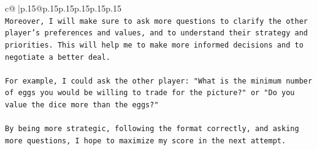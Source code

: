 \documentclass{article}
\begin{document}
{\begin{supertabular}{c@{$\;$}|p{.15\linewidth}@{}p{.15\linewidth}p{.15\linewidth}p{.15\linewidth}p{.15\linewidth}p{.15\linewidth}}
{{{\\ 
\texttt{Moreover, I will make sure to ask more questions to clarify the other player's preferences and values, and to understand their strategy and priorities. This will help me to make more informed decisions and to negotiate a better deal. } \\
\\ 
\texttt{For example, I could ask the other player: "What is the minimum number of eggs you would be willing to trade for the picture?" or "Do you value the dice more than the eggs?" } \\
\\ 
\texttt{By being more strategic, following the format correctly, and asking more questions, I hope to maximize my score in the next attempt.} \\
            }
        }
    }
     \\ \\

\end{supertabular}
}
\end{document}

